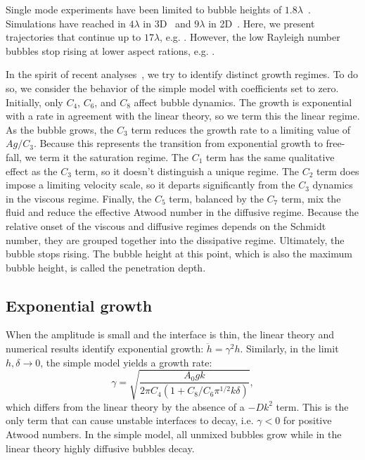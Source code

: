 Single mode experiments have been limited to bubble heights of $1.8\lambda$~\cite{Wilkinson2007}.
Simulations have reached in $4\lambda$ in 3D~\cite{Ramaprabhu2012} and $9\lambda$ in 2D~\cite{Wei2012}.
Here, we present trajectories that continue up to $17\lambda$, e.g. .
However, the low Rayleigh number bubbles stop rising at lower aspect rations, e.g. .

In the spirit of recent analyses~\cite{Ramaprabhu2012, Wei2012}, we try to identify distinct growth regimes.
To do so, we consider the behavior of the simple model with coefficients set to zero.
Initially, only $C_4$, $C_6$, and $C_8$ affect bubble dynamics.
The growth is exponential with a rate in agreement with the linear theory, so we term this the linear regime.
As the bubble grows, the $C_3$ term reduces the growth rate to a limiting value of $A g / C_3$.
Because this represents the transition from exponential growth to free-fall, we term it the saturation regime.
The $C_1$ term has the same qualitative effect as the $C_3$ term, so it doesn't distinguish a unique regime.
The $C_2$ term does impose a limiting velocity scale, so it departs significantly from the $C_3$ dynamics in the viscous regime.
Finally, the $C_5$ term, balanced by the $C_7$ term, mix the fluid and reduce the effective Atwood number in the diffusive regime.
Because the relative onset of the viscous and diffusive regimes depends on the Schmidt number, they are grouped together into the dissipative regime.
Ultimately, the bubble stops rising.
The bubble height at this point, which is also the maximum bubble height, is called the penetration depth.

\subsection{Exponential growth}
When the amplitude is small and the interface is thin, the linear theory and numerical results identify exponential growth: $\ddot{h} = \gamma^2 h$.
Similarly, in the limit $h, \delta \rightarrow 0$, the simple model yields a growth rate:
\begin{equation}
\gamma = \sqrt{\frac{A_0 g k}{2 \pi C_4(1 + C_8 / C_6 \pi^{1/2} k \delta)}},
\end{equation}
which differs from the linear theory by the absence of a $-D k^2$ term.
This is the only term that can cause unstable interfaces to decay, i.e. $\gamma < 0$ for positive Atwood numbers.
In the simple model, all unmixed bubbles grow while in the linear theory highly diffusive bubbles decay.

